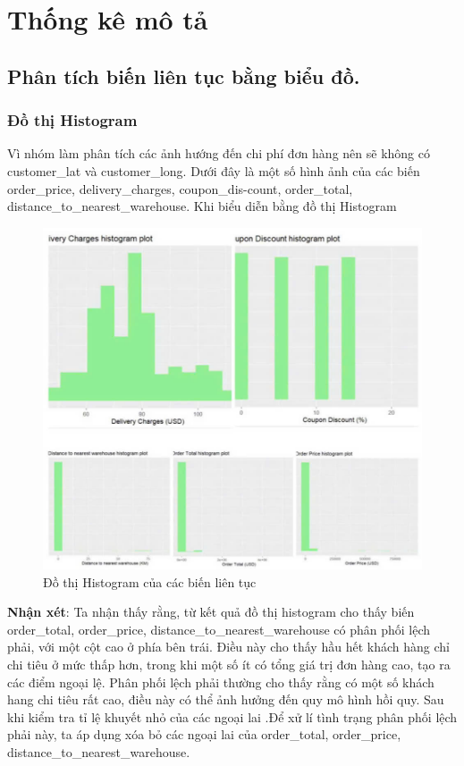 \section{Thống kê mô tả}

\subsection{Phân tích biến liên tục bằng biểu đồ.}
\subsubsection{Đồ thị Histogram}
	Vì nhóm làm phân tích các ảnh hướng đến chi phí đơn hàng nên sẽ không có customer\_lat và customer\_long. Dưới đây là một số hình ảnh của các biến order\_price, delivery\_charges, coupon\_dis-count, order\_total, distance\_to\_nearest\_warehouse. Khi biểu diễn bằng đồ thị Histogram
\begin{figure}[H]
    \centering
    \includegraphics[width=0.7\linewidth]{graphics/bang7.jpg}
    \caption{Đồ thị Histogram của các biến liên tục}
\end{figure}
\FloatBarrier

\textbf{Nhận xét}: Ta nhận thấy rằng, từ kết quả đồ thị histogram cho thấy biến order\_total, order\_price, distance\_to\_nearest\_warehouse có phân phối lệch phải, với một cột cao ở phía bên trái. Điều này cho thấy hầu hết khách hàng chỉ chi tiêu ở mức thấp hơn, trong khi một số ít có tổng giá trị đơn hàng cao, tạo ra các điểm ngoại lệ. Phân phối lệch phải thường cho thấy  rằng có một số khách hang chi tiêu rất cao, điều này có thể ảnh hưởng đến quy mô hình hồi quy. Sau khi kiểm tra tỉ lệ khuyết nhỏ của các ngoại lai .Để xử lí tình trạng phân phối lệch phải này, ta áp dụng xóa bỏ các ngoại lai  của order\_total, order\_price, distance\_to\_nearest\_warehouse.


